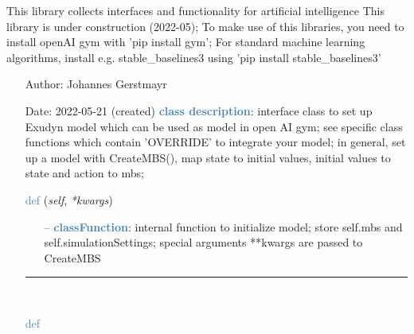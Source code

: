 
\label{sec:module:artificialIntelligence}
  This library collects interfaces and functionality for artificial intelligence
			This library is under construction (2022-05);
           To make use of this libraries, you need to install openAI gym with 'pip install gym';
           For standard machine learning algorithms, install e.g. stable\_baselines3 using 'pip install stable\_baselines3'
\begin{itemize}[leftmargin=1.4cm]
\setlength{\itemindent}{-1.4cm}
\item[]Author:    Johannes Gerstmayr
\item[]Date:      2022-05-21 (created)
\ei
{}
\noindent\textcolor{steelblue}{{\bf class description}}:  interface class to set up Exudyn model which can be used as model in open AI gym;
         see specific class functions which contain 'OVERRIDE' to integrate your model;
         in general, set up a model with CreateMBS(), map state to initial values, initial values to state and action to mbs;
\vspace{3pt} \\ 
\begin{flushleft}
\noindent \textcolor{steelblue}{def {\bf {}}}\label{sec:artificialIntelligence:OpenAIGymInterfaceEnv:__init__}
({\it self}, {\it **kwargs})
\end{flushleft}
\setlength{\itemindent}{0.7cm}
\begin{itemize}[leftmargin=0.7cm]
\item[--]\textcolor{steelblue}{\bf classFunction}: internal function to initialize model; store self.mbs and self.simulationSettings; special arguments **kwargs are passed to CreateMBS
\vspace{12pt}\end{itemize}
%
\noindent\rule{8cm}{0.75pt}\vspace{1pt} \\ 
\begin{flushleft}
\noindent \textcolor{steelblue}{def {\bf {}}}\label{sec:artificialIntelligence:OpenAIGymInterfaceEnv:CreateMBS}

\end{flushleft}
\end{itemize}
